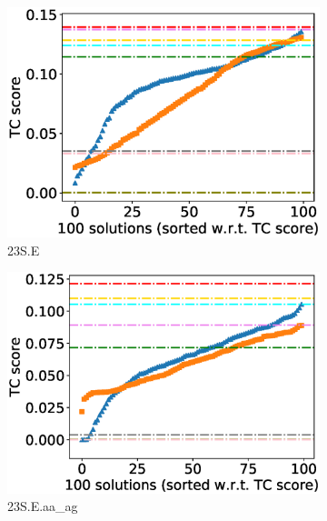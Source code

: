 \begin{figure}[!htbp]
\begin{adjustwidth}{-0.5cm}{-0.5cm}
\begin{subfigure}{0.25\textwidth}
			\includegraphics[width=\columnwidth]{Figure/summary/precomputedInit/23S.E/tc_density_single_run}
			\caption{23S.E}
		\end{subfigure}    
		\begin{subfigure}{0.25\textwidth}
			\includegraphics[width=\columnwidth]{Figure/summary/precomputedInit/23S.E.aa_ag/tc_density_single_run}
			\caption{23S.E.aa\_ag}
		\end{subfigure}
		\begin{subfigure}{0.25\textwidth}

\end{subfigure}
\end{adjustwidth}
\end{figure}
